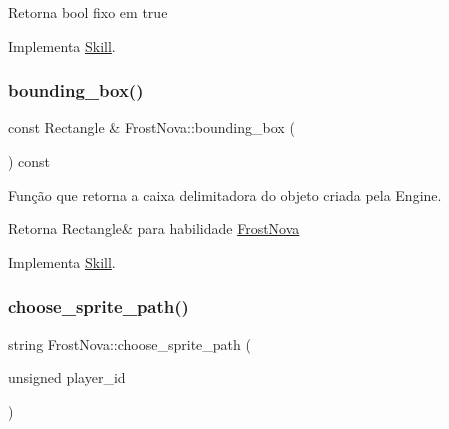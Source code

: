 \begin{DoxyReturn}{Retorna}
bool fixo em true 
\end{DoxyReturn}


Implementa \mbox{\hyperlink{classSkill_a1744c0c7f03304b1a0444a1bd95661c0}{Skill}}.

\mbox{\label{classFrostNova_a4d70c5ea288631e425dadcf5e479a1b6}} 
\subsubsection{\texorpdfstring{bounding\+\_\+box()}{bounding\_box()}}
{\footnotesize\ttfamily const Rectangle \& Frost\+Nova\+::bounding\+\_\+box (\begin{DoxyParamCaption}{ }\end{DoxyParamCaption}) const\hspace{0.3cm}{\ttfamily [virtual]}}



Função que retorna a caixa delimitadora do objeto criada pela Engine. 

\begin{DoxyReturn}{Retorna}
Rectangle\& para habilidade \mbox{\hyperlink{classFrostNova}{Frost\+Nova}} 
\end{DoxyReturn}


Implementa \mbox{\hyperlink{classSkill}{Skill}}.

\mbox{\label{classFrostNova_afc420630fdfd93b865ea086b0e0c55ba}} 
\subsubsection{\texorpdfstring{choose\+\_\+sprite\+\_\+path()}{choose\_sprite\_path()}}
{\footnotesize\ttfamily string Frost\+Nova\+::choose\+\_\+sprite\+\_\+path (\begin{DoxyParamCaption}\item[{unsigned}]{player\+\_\+id }\end{DoxyParamCaption})\hspace{0.3cm}{\ttfamily [protected]}}



